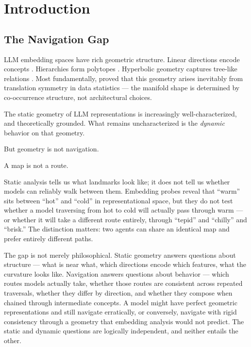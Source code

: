 \section{Introduction}\label{introduction}

\subsection{The Navigation Gap}\label{the-navigation-gap}

LLM embedding spaces have rich geometric structure. Linear directions encode concepts \citep{park2024linear}. Hierarchies form polytopes \citep{park2025geometry}. Hyperbolic geometry captures tree-like relations \citep{nickel2017poincare}. Most fundamentally, \citet{karkada2025translation} proved that this geometry arises inevitably from translation symmetry in data statistics --- the manifold shape is determined by co-occurrence structure, not architectural choices.

The static geometry of LLM representations is increasingly well-characterized, and theoretically grounded. What remains uncharacterized is the \emph{dynamic} behavior on that geometry.

But geometry is not navigation.

A map is not a route.

Static analysis tells us what landmarks look like; it does not tell us whether models can reliably walk between them. Embedding probes reveal that ``warm'' sits between ``hot'' and ``cold'' in representational space, but they do not test whether a model traversing from hot to cold will actually pass through warm --- or whether it will take a different route entirely, through ``tepid'' and ``chilly'' and ``brisk.'' The distinction matters: two agents can share an identical map and prefer entirely different paths.

The gap is not merely philosophical. Static geometry answers questions about structure --- what is near what, which directions encode which features, what the curvature looks like. Navigation answers questions about behavior --- which routes models actually take, whether those routes are consistent across repeated traversals, whether they differ by direction, and whether they compose when chained through intermediate concepts. A model might have perfect geometric representations and still navigate erratically, or conversely, navigate with rigid consistency through a geometry that embedding analysis would not predict. The static and dynamic questions are logically independent, and neither entails the other.

